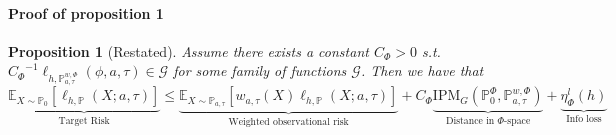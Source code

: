 \documentclass{article}
\newtheorem{proposition}{Proposition}
\newcommand{\IPM}{\text{IPM}}
\begin{document}
\paragraph{Proof of proposition 1}
\begin{proposition}[Restated] Assume there exists a constant $C_\Phi>0$ s.t. ${C_\Phi}^{-1} \ell_{h,\mathbb{P}^{w, \Phi}_{a, \tau}}(\phi, a, \tau) \in \mathcal{G}$ for some family of functions $\mathcal{G}$. Then we have that 
\begin{equation}\label{eq:mainbound_apendix}
   \underbrace{\mathbb{E}_{X \sim \mathbb{P}_0}[\ell_{h, \mathbb{P}}(X; a, \tau)]}_{\text{Target Risk}} \leq  \underbrace{\mathbb{E}_{X \sim \mathbb{P}_{a, \tau}}[w_{a, \tau}(X)\ell_{h, \mathbb{P}}(X; a, \tau)]}_{\text{Weighted observational risk}} + C_\Phi \underbrace{\IPM_G(\mathbb{P}^{\Phi}_0, \mathbb{P}^{w, \Phi}_{a, \tau})}_{\text{Distance in } \Phi \text{-space}} + \underbrace{\eta^l_\Phi(h)}_{\text{Info loss}}
\end{equation}
\end{proposition} 
\end{document}
